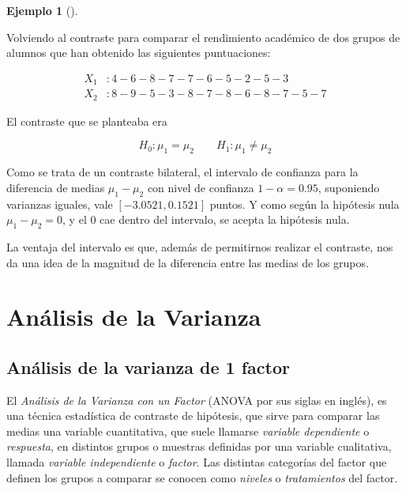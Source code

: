 \documentclass[
  spanish,
  a4paper,
]{scrreport}
\theoremstyle{plain}
\theoremstyle{definition}
\newtheorem{example}{Ejemplo}[chapter]
\theoremstyle{definition}
\theoremstyle{remark}
\begin{document}
\begin{example}[]\protect\hypertarget{exm-contraste-mediante-intervalos-confianza}{}\label{exm-contraste-mediante-intervalos-confianza}

Volviendo al contraste para comparar el rendimiento académico de dos
grupos de alumnos que han obtenido las siguientes puntuaciones:

\begin{align*}
X_1 &: 4 - 6 - 8 - 7 - 7 - 6 - 5 - 2 - 5 - 3  \\
X_2 &: 8 - 9 - 5 - 3 - 8 - 7 - 8 - 6 - 8 - 7 - 5 - 7
\end{align*}

El contraste que se planteaba era

\[
H_0: \mu_1=\mu_2\qquad H_1: \mu_1\neq \mu_2
\]

Como se trata de un contraste bilateral, el intervalo de confianza para
la diferencia de medias \(\mu_1-\mu_2\) con nivel de confianza
\(1-\alpha=0.95\), suponiendo varianzas iguales, vale
\([-3.0521, 0.1521]\) puntos. Y como según la hipótesis nula
\(\mu_1-\mu_2=0\), y el 0 cae dentro del intervalo, se acepta la
hipótesis nula.

La ventaja del intervalo es que, además de permitirnos realizar el
contraste, nos da una idea de la magnitud de la diferencia entre las
medias de los grupos.

\end{example}


\chapter{Análisis de la Varianza}\label{anuxe1lisis-de-la-varianza}

\section{Análisis de la varianza de 1
factor}\label{anuxe1lisis-de-la-varianza-de-1-factor}

El \emph{Análisis de la Varianza con un Factor} (ANOVA por sus siglas en
inglés), es una técnica estadística de contraste de hipótesis, que sirve
para comparar las medias una variable cuantitativa, que suele llamarse
\emph{variable dependiente} o \emph{respuesta}, en distintos grupos o
muestras definidas por una variable cualitativa, llamada \emph{variable
independiente} o \emph{factor}. Las distintas categorías del factor que
definen los grupos a comparar se conocen como \emph{niveles} o
\emph{tratamientos} del factor.
\end{document}
